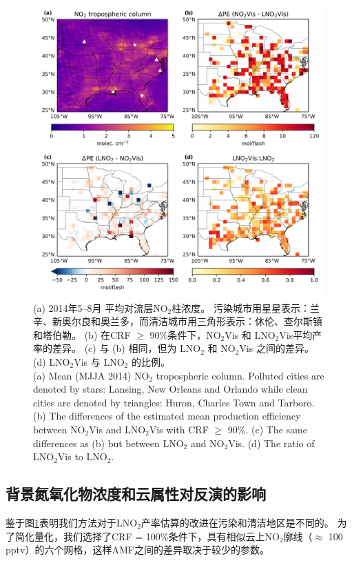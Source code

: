 \begin{figure}[t]
\centering
\includegraphics[width=13cm]{./figures/delta.png}
\caption{(a) 2014年5--8月  平均对流层NO$_\textrm{2}$柱浓度。
污染城市用星星表示：兰辛、新奥尔良和奥兰多，而清洁城市用三角形表示：休伦、查尔斯镇和塔伯勒。
(b) 在CRF $\geq$ 90\%条件下，NO$_\textrm{2}$Vis 和 LNO$_\textrm{2}$Vis平均产率的差异。
(c) 与 (b) 相同，但为 LNO$_\textrm{2}$ 和 NO$_\textrm{2}$Vis 之间的差异。
(d) LNO$_\textrm{2}$Vis 与 LNO$_\textrm{2}$ 的比例。\\
(a) Mean (MJJA 2014) NO$_\textrm{2}$ tropospheric column.
Polluted cities are denoted by stars: Lansing, New Orleans and Orlando while clean cities are denoted by triangles: Huron, Charles Town and Tarboro.
(b) The differences of the estimated mean production efficiency between NO$_\textrm{2}$Vis and LNO$_\textrm{2}$Vis with CRF $\geq$ 90\%.
(c) The same differences as (b) but between LNO$_\textrm{2}$ and NO$_\textrm{2}$Vis.
(d) The ratio of LNO$_\textrm{2}$Vis to LNO$_\textrm{2}$.
}
\label{fig:delta}
\end{figure}

\subsection{背景氮氧化物浓度和云属性对反演的影响}

鉴于图\ref{fig:delta}表明我们方法对于LNO$_2$产率估算的改进在污染和清洁地区是不同的。
为了简化量化，我们选择了CRF = 100\%条件下，具有相似云上NO$_2$廓线（$\approx$ 100 pptv）的六个网格，这样AMF之间的差异取决于较少的参数。

